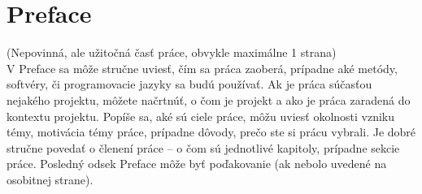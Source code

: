 \chapter*{Preface}

(Nepovinná, ale užitočná časť práce, obvykle maximálne 1 strana)\\

V Preface sa môže stručne uviesť, čím sa práca zaoberá, prípadne aké metódy, softvéry, či programovacie jazyky sa budú používať. Ak je práca súčasťou nejakého projektu, môžete načrtnúť, o čom je projekt a ako je práca zaradená do kontextu projektu. Popíše sa, aké sú ciele práce, môžu uviesť okolnosti vzniku témy, motivácia témy práce, prípadne dôvody, prečo ste si prácu vybrali. Je dobré stručne povedať o členení práce -- o čom sú jednotlivé kapitoly, prípadne sekcie práce. Posledný odsek Preface môže byť poďakovanie (ak nebolo uvedené na osobitnej strane).
